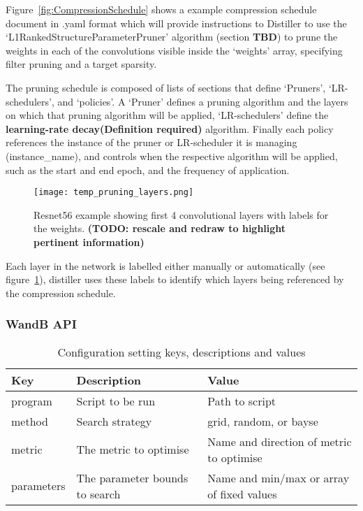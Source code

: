 \documentclass[../Dissertation.tex]{subfiles}
\begin{document}
Figure~\ref{fig:CompressionSchedule} shows a example compression schedule document in .yaml format which will provide instructions to Distiller to use the `L1RankedStructureParameterPruner' algorithm (section \textbf{TBD}) to prune the weights in each of the convolutions visible inside the `weights' array, specifying filter pruning and a target sparsity.

The pruning schedule is composed of lists of sections that define `Pruners', `LR-schedulers', and `policies'. A `Pruner' defines a pruning algorithm and the layers on which that pruning algorithm will be applied, `LR-schedulers' define the \textbf{learning-rate decay(Definition required)} algorithm. 
Finally each policy references the instance of the pruner or LR-scheduler it is managing (instance\_name), and controls when the respective algorithm will be applied, such as the start and end epoch, and the frequency of application.

\begin{figure}[H]
    \texttt{[image: temp\_pruning\_layers.png]}
    \caption{Resnet56 example showing first 4 convolutional layers with labels for the weights. \textbf{(TODO: rescale and redraw to highlight pertinent information)}}
    \label{fig:resnet56weightlabels}
\end{figure}

Each layer in the network is labelled either manually or automatically (see figure~\ref{fig:resnet56weightlabels}), distiller uses these labels to identify which layers being referenced by the compression schedule. 



\subsubsection{WandB API}

\begin{table}[H]
    \begin{tabular}{@{}|l|l|l|@{}}
    \toprule
    Key        & Description                    & Value                                    \\ \midrule
    program    & Script to be run               & Path to script                           \\ \midrule
    method     & Search strategy                & grid, random, or bayse                   \\ \midrule
    metric     & The metric to optimise         & Name and direction of metric to optimise \\ \midrule
    parameters & The parameter bounds to search & Name and min/max or array of fixed values  \\ \bottomrule
    \end{tabular}
    \caption{Configuration setting keys, descriptions and values}
    \label{tab:WandBConfig}
\end{table}
\end{document}
